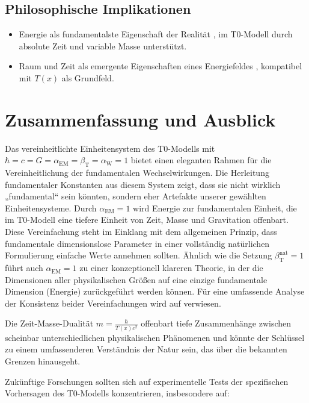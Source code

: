 \documentclass[12pt,a4paper]{article}
\newcommand{\Tfield}{T(x)}
\newcommand{\betaT}{\beta_{\text{T}}}
\newcommand{\alphaEM}{\alpha_{\text{EM}}}
\newcommand{\alphaW}{\alpha_{\text{W}}}
\begin{document}
	\subsection{Philosophische Implikationen}
	
	\begin{itemize}
		\item Energie als fundamentalste Eigenschaft der Realität \cite{Wilczek2008}, im T0-Modell durch absolute Zeit und variable Masse unterstützt.
		\item Raum und Zeit als emergente Eigenschaften eines Energiefeldes \cite{Verlinde2011}, kompatibel mit \(\Tfield\) als Grundfeld.
	\end{itemize}
	
	\section{Zusammenfassung und Ausblick}
	
	Das vereinheitlichte Einheitensystem des T0-Modells mit \(\hbar = c = G = \alphaEM = \betaT = \alphaW = 1\) bietet einen eleganten Rahmen für die Vereinheitlichung der fundamentalen Wechselwirkungen. Die Herleitung fundamentaler Konstanten aus diesem System zeigt, dass sie nicht wirklich „fundamental“ sein könnten, sondern eher Artefakte unserer gewählten Einheitensysteme. Durch \(\alphaEM = 1\) wird Energie zur fundamentalen Einheit, die im T0-Modell eine tiefere Einheit von Zeit, Masse und Gravitation offenbart. Diese Vereinfachung steht im Einklang mit dem allgemeinen Prinzip, dass fundamentale dimensionslose Parameter in einer vollständig natürlichen Formulierung einfache Werte annehmen sollten. Ähnlich wie die Setzung \(\betaT^{\text{nat}} = 1\) führt auch \(\alphaEM = 1\) zu einer konzeptionell klareren Theorie, in der die Dimensionen aller physikalischen Größen auf eine einzige fundamentale Dimension (Energie) zurückgeführt werden können. Für eine umfassende Analyse der Konsistenz beider Vereinfachungen wird auf \cite{pascher_alphabeta_2025} verwiesen.
	
	Die Zeit-Masse-Dualität \(m = \frac{\hbar}{\Tfield c^2}\) offenbart tiefe Zusammenhänge zwischen scheinbar unterschiedlichen physikalischen Phänomenen und könnte der Schlüssel zu einem umfassenderen Verständnis der Natur sein, das über die bekannten Grenzen hinausgeht.
	
	Zukünftige Forschungen sollten sich auf experimentelle Tests der spezifischen Vorhersagen des T0-Modells konzentrieren, insbesondere auf:
	
\end{document}
